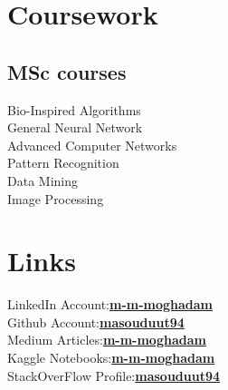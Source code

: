 \documentclass[]{deedy-resume-reversed}
\begin{document}
\begin{minipage}[t]{0.33\textwidth}

\section{Coursework}
\subsection{MSc courses}
\sectionsep

\textbullet{} Bio-Inspired Algorithms \\
\textbullet{} General Neural Network \\
\textbullet{} Advanced Computer Networks \\
\textbullet{} Pattern Recognition \\
\textbullet{} Data Mining \\
\textbullet{} Image Processing \\

\sectionsep


\section{Links}
\textbullet{} LinkedIn Account:\href{https://www.linkedin.com/in/m-m-moghadam/}{\bf \hfill m-m-moghadam} \\
\textbullet{} Github Account:\href{https://github.com/masouduut94}{\bf \hfill  masouduut94} \\
\textbullet{} Medium Articles:\href{https://m-m-moghadam.medium.com/}{\bf \hfill m-m-moghadam} \\
\textbullet{} Kaggle Notebooks:\href{https://www.kaggle.com/masouduut94}{\bf \hfill m-m-moghadam} \\
\textbullet{} StackOverFlow Profile:\href{https://stackoverflow.com/users/6118987/masouduut94}{\bf \hfill masouduut94} \\
\sectionsep

\end{minipage}
\end{document}
